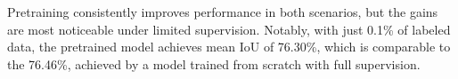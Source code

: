 \documentclass[review,authoryear]{elsarticle}
\begin{document}
Pretraining consistently improves performance in both scenarios, but the gains are most noticeable under limited supervision. Notably, with just 0.1\% of labeled data, the pretrained model achieves mean IoU of 76.30\%, which is comparable to the 76.46\%, achieved by a model trained from scratch with full supervision. 


\end{document}

